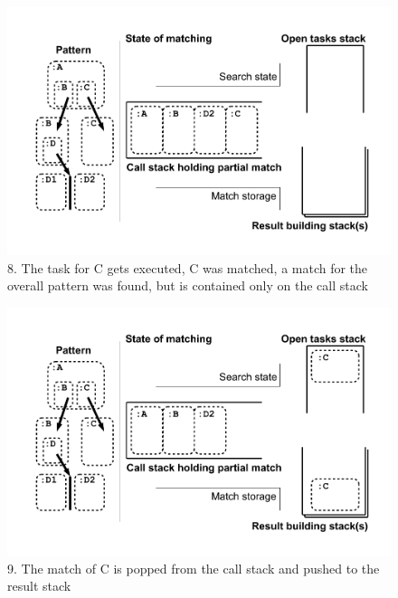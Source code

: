 \begin{figure}[htbp]
  \centering
  \includegraphics[width=\textwidth]{fig/Passungszustand8}
  \caption{8. The task for C gets executed, C was matched, a match for the overall pattern was found, but is contained only on the call stack}
  \label{figmatchingstate8}
\end{figure}

\begin{figure}[htbp]
  \centering
  \includegraphics[width=\textwidth]{fig/Passungszustand9}
  \caption{9. The match of C is popped from the call stack and pushed to the result stack}
  \label{figmatchingstate9}
\end{figure}

